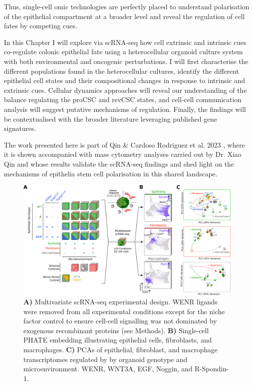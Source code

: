 
Thus, single-cell omic technologies are perfectly placed to understand polarisation of the epithelial compartment at a broader level and reveal the regulation of cell fates by competing cues.

In this Chapter I will explore via scRNA-seq how cell extrinsic and intrinsic cues co-regulate colonic epithelial fate using a heterocellular organoid culture system with both environmental and oncogenic perturbations. I will first characterise the different populations found in the heterocellular cultures, identify the different epithelial cell states and their compositional changes in response to intrinsic and extrinsic cues. Cellular dynamics approaches will reveal our understanding of the balance regulating the proCSC and revCSC states, and cell-cell communication analysis will suggest putative mechanisms of regulation. Finally, the findings will be contextualised with the broader literature leveraging published gene signatures.

The work presented here is part of Qin \& Cardoso Rodriguez et al. 2023 \cite{cardoso_rodriguez_single-cell_2023}, where it is shown accompanied with mass cytometry analyses carried out by Dr. Xiao Qin and whose results validate the scRNA-seq findings and shed light on the mechanisms of epithelia stem cell polarisation in this shared landscape.

\begin{figure}
    \centering
    \includegraphics{04seq/figs/4SEQ_ExpDesign.png}
    \caption{\textbf{A)} Multivariate scRNA-seq experimental design. WENR ligands were removed from all experimental conditions except for the niche factor control to ensure cell-cell signalling was not dominated by exogenous recombinant proteins (see Methods). \textbf{B)} Single-cell PHATE embedding illustrating epithelial cells, fibroblasts, and macrophages. \textbf{C)} PCAs of epithelial, fibroblast, and macrophage transcriptomes regulated by by organoid genotype and microenvironment. WENR, WNT3A, EGF, Noggin, and R-Spondin-1.}
    \label{fig:4exp}
\end{figure}

